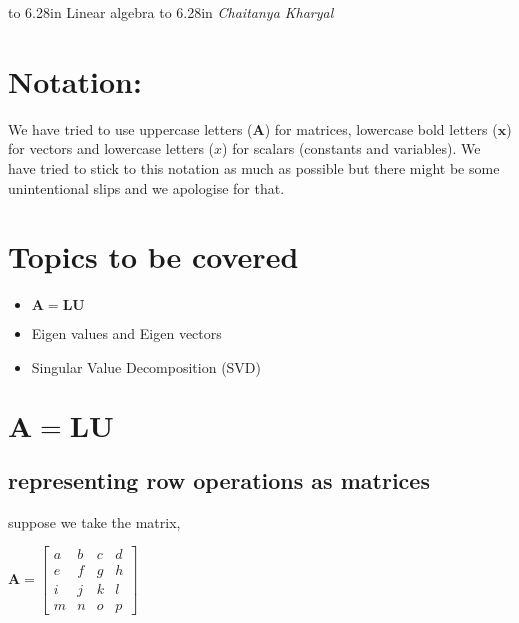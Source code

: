 \documentclass[a4paper]{article}
\begin{document}
\pagestyle{myheadings}
   \thispagestyle{plain}
   \newpage
   \noindent
   \begin{center}
   \framebox
   {
      \vbox{\vspace{2mm}
        \hbox to 6.28in { {\Large \hfill Linear algebra \hfill} } %
        \vspace{2mm}
        \hbox to 6.28in { {\it Chaitanya Kharyal \hfill} } %
        \vspace{2mm}}
   }
   \end{center}
   \markboth{}{} %

\section{Notation:}
We have tried to use uppercase letters ($\mathbf{A}$) for matrices, lowercase bold letters ($\mathbf{x}$) for vectors and lowercase letters ($x$) for scalars (constants and variables). We have tried to stick to this notation as much as possible but there might be some unintentional slips and we apologise for that.

\section{Topics to be covered}
\begin{itemize}
    \item $\mathbf{A} = \mathbf{L}\mathbf{U}$
    \item Eigen values and Eigen vectors
    \item Singular Value Decomposition (SVD)
\end{itemize}

\section{$\mathbf{A} = \mathbf{L}\mathbf{U}$}
    \subsection{representing row operations as matrices}
        suppose we take the matrix,
        \begin{center}
            $
            \mathbf{A} = 
            \begin{bmatrix}
                a & b & c & d \\ 
                e & f & g & h \\
                i & j & k & l \\
                m & n & o & p 
            \end{bmatrix}
            $
        \end{center}
        
\end{document}
